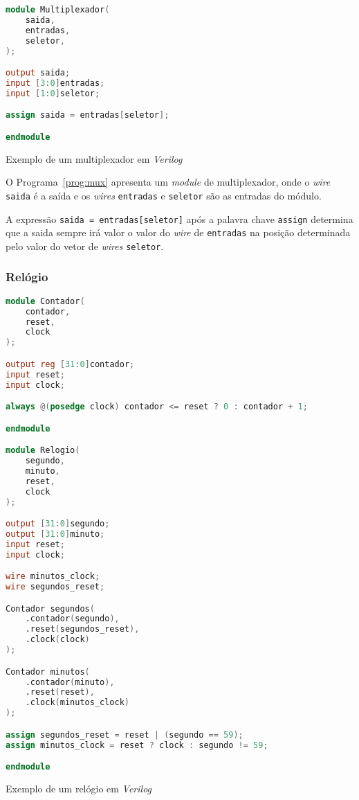 \begin{program}
  \centering

\begin{lstlisting}[language=Verilog, style=wider]
module Multiplexador(
    saida,
    entradas,
    seletor,
);

output saida;
input [3:0]entradas;
input [1:0]seletor;

assign saida = entradas[seletor];

endmodule
\end{lstlisting}

  \caption{Exemplo de um multiplexador em \emph{Verilog}\label{prog:mux}}
\end{program}

O Programa~\ref{prog:mux} apresenta um \emph{module} de multiplexador,
onde o \emph{wire} \texttt{saida} é a saída e os \emph{wires}
\texttt{entradas} e \texttt{seletor} são as entradas do módulo.

A expressão \texttt{saida = entradas[seletor]} após a palavra chave
\texttt{assign} determina que a saida sempre irá valor o valor do
\emph{wire} de \texttt{entradas} na posição determinada pelo valor 
do vetor de \emph{wires} \texttt{seletor}.

\subsubsection{Relógio}
\label{ssec:clock}

\begin{program}
  \centering

\begin{lstlisting}[language=Verilog, style=wider]
module Contador(
    contador,
    reset,
    clock
);

output reg [31:0]contador;
input reset;
input clock;

always @(posedge clock) contador <= reset ? 0 : contador + 1;

endmodule

module Relogio(
    segundo,
    minuto,
    reset,
    clock
);

output [31:0]segundo;
output [31:0]minuto;
input reset;
input clock;

wire minutos_clock;
wire segundos_reset;

Contador segundos(
    .contador(segundo),
    .reset(segundos_reset),
    .clock(clock)
);

Contador minutos(
    .contador(minuto),
    .reset(reset),
    .clock(minutos_clock)
);

assign segundos_reset = reset | (segundo == 59);
assign minutos_clock = reset ? clock : segundo != 59;

endmodule
\end{lstlisting}

  \caption{Exemplo de um relógio em \emph{Verilog}\label{prog:clock}}
\end{program}


